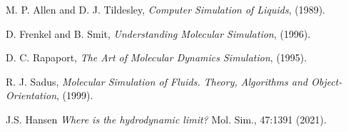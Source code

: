 \documentclass[11pt]{article}
\begin{document}
\begin{thebibliography}{9}

  M. P. Allen and D. J. Tildesley, \emph{Computer Simulation of Liquids}, (1989). 

  D. Frenkel and B. Smit, \emph{Understanding Molecular Simulation}, (1996).

 D. C. Rapaport, \emph{The Art of Molecular Dynamics Simulation}, (1995).

  R. J. Sadus, \emph{Molecular Simulation of Fluids. Theory, Algorithms and
    Object-Orientation}, (1999).

  J.S. Hansen \emph{Where is the hydrodynamic limit?} Mol. Sim., 47:1391 (2021).
\end{thebibliography}

\appendix

\clearpage
\end{document}
